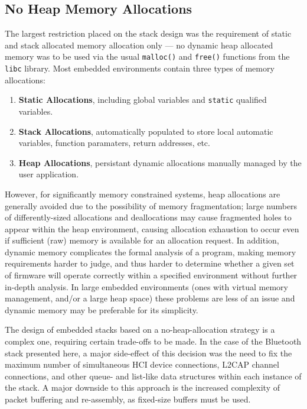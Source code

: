 \FloatBarrier
\subsection{No Heap Memory Allocations}

The largest restriction placed on the stack design was the requirement of static and stack allocated memory allocation only --- no dynamic heap allocated memory was to be used via the usual \lstinline{malloc()} and \lstinline{free()} functions from the \texttt{libc} library. Most embedded environments contain three types of memory allocations:

\begin{enumerate}
	\item \textbf{Static Allocations}, including global variables and \lstinline{static} qualified variables.
	\item \textbf{Stack Allocations}, automatically populated to store local automatic variables, function paramaters, return addresses, etc.
	\item \textbf{Heap Allocations}, persistant dynamic allocations manually managed by the user application.
\end{enumerate}

However, for significantly memory constrained systems, heap allocations are generally avoided due to the possibility of memory fragmentation; large numbers of differently-sized allocations and deallocations may cause fragmented holes to appear within the heap environment, causing allocation exhaustion to occur even if sufficient (raw) memory is available for an allocation request. In addition, dynamic memory complicates the formal analysis of a program, making memory requirements harder to judge, and thus harder to determine whether a given set of firmware will operate correctly within a specified environment without further in-depth analysis. In large embedded environments (ones with virtual memory management, and/or a large heap space) these problems are less of an issue and dynamic memory may be preferable for its simplicity.

The design of embedded stacks based on a no-heap-allocation strategy is a complex one, requiring certain trade-offs to be made. In the case of the Bluetooth stack presented here, a major side-effect of this decision was the need to fix the maximum number of simultaneous HCI device connections, L2CAP channel connections, and other queue- and list-like data structures within each instance of the stack. A major downside to this approach is the increased complexity of packet buffering and re-assembly, as fixed-size buffers must be used.

